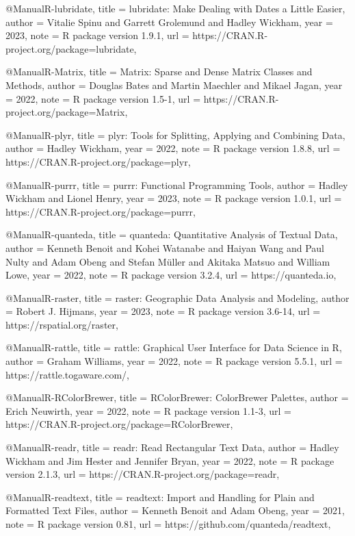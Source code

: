 @Manual{R-lubridate,
  title = {lubridate: Make Dealing with Dates a Little Easier},
  author = {Vitalie Spinu and Garrett Grolemund and Hadley Wickham},
  year = {2023},
  note = {R package version 1.9.1},
  url = {https://CRAN.R-project.org/package=lubridate},
}

@Manual{R-Matrix,
  title = {Matrix: Sparse and Dense Matrix Classes and Methods},
  author = {Douglas Bates and Martin Maechler and Mikael Jagan},
  year = {2022},
  note = {R package version 1.5-1},
  url = {https://CRAN.R-project.org/package=Matrix},
}

@Manual{R-plyr,
  title = {plyr: Tools for Splitting, Applying and Combining Data},
  author = {Hadley Wickham},
  year = {2022},
  note = {R package version 1.8.8},
  url = {https://CRAN.R-project.org/package=plyr},
}

@Manual{R-purrr,
  title = {purrr: Functional Programming Tools},
  author = {Hadley Wickham and Lionel Henry},
  year = {2023},
  note = {R package version 1.0.1},
  url = {https://CRAN.R-project.org/package=purrr},
}

@Manual{R-quanteda,
  title = {quanteda: Quantitative Analysis of Textual Data},
  author = {Kenneth Benoit and Kohei Watanabe and Haiyan Wang and Paul Nulty and Adam Obeng and Stefan Müller and Akitaka Matsuo and William Lowe},
  year = {2022},
  note = {R package version 3.2.4},
  url = {https://quanteda.io},
}

@Manual{R-raster,
  title = {raster: Geographic Data Analysis and Modeling},
  author = {Robert J. Hijmans},
  year = {2023},
  note = {R package version 3.6-14},
  url = {https://rspatial.org/raster},
}

@Manual{R-rattle,
  title = {rattle: Graphical User Interface for Data Science in R},
  author = {Graham Williams},
  year = {2022},
  note = {R package version 5.5.1},
  url = {https://rattle.togaware.com/},
}

@Manual{R-RColorBrewer,
  title = {RColorBrewer: ColorBrewer Palettes},
  author = {Erich Neuwirth},
  year = {2022},
  note = {R package version 1.1-3},
  url = {https://CRAN.R-project.org/package=RColorBrewer},
}

@Manual{R-readr,
  title = {readr: Read Rectangular Text Data},
  author = {Hadley Wickham and Jim Hester and Jennifer Bryan},
  year = {2022},
  note = {R package version 2.1.3},
  url = {https://CRAN.R-project.org/package=readr},
}

@Manual{R-readtext,
  title = {readtext: Import and Handling for Plain and Formatted Text Files},
  author = {Kenneth Benoit and Adam Obeng},
  year = {2021},
  note = {R package version 0.81},
  url = {https://github.com/quanteda/readtext},
}

